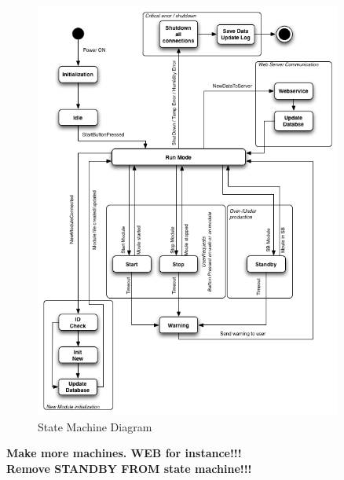 	\begin{figure}[H]
		\begin{centering}
			 \includegraphics[width=0.9\textwidth]{images/statemachine.png}
		\caption{State Machine Diagram}
	 	\end{centering}
	\end{figure}
\textbf{{\Huge Make more machines. WEB for instance!!!\\Remove STANDBY FROM state machine!!!}}
